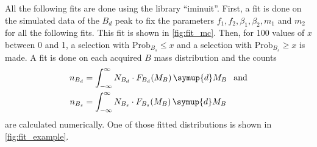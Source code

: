 All the following fits are done using the library \enquote{iminuit}\cite{iminuit}.
First, a fit is done on the simulated data of the $B_d$ peak to fix the parameters $f_1,f_2,\beta_1,\beta_2,m_1$ and $m_2$ for all the following fits. 
This fit is shown in \autoref{fig:fit_mc}.
Then, for 100 values of $x$ between 0 and 1, a selection with $\text{Prob}_{B_s} \leq x$ and a selection with $\text{Prob}_{B_s} \geq x$ is made.
A fit is done on each acquired $B$ mass distribution and the counts
\begin{align*}
    n_{B_d} &= \int_{-\infty}^{\infty} N_{B_d} \cdot F_{B_d}(M_B) \, \symup{d}M_B \:\:\text{ and} \\
    n_{B_s} &= \int_{-\infty}^{\infty} N_{B_s} \cdot F_{B_s}(M_B) \, \symup{d}M_B
\end{align*}
are calculated numerically.
One of those fitted distributions is shown in \autoref{fig:fit_example}.

